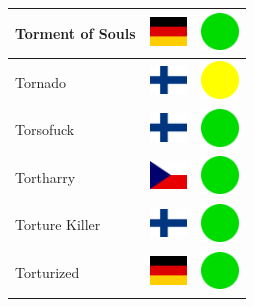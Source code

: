 \documentclass[12pt, a4paper, twoside]{report}
\begin{document}
\begin{center}
\begin{longtable}{|p{5cm}|p{2cm}|p{2cm}|}
 Torment of Souls                                           & \includegraphics[width=1cm]{../4x3/de} &   \includegraphics[width=1cm]{../likes/y} \\ \hline
 Tornado                                                    & \includegraphics[width=1cm]{../4x3/fi} &   \includegraphics[width=1cm]{../likes/m} \\ \hline
 Torsofuck                                                  & \includegraphics[width=1cm]{../4x3/fi} &   \includegraphics[width=1cm]{../likes/y} \\ \hline
 Tortharry                                                  & \includegraphics[width=1cm]{../4x3/cz} &   \includegraphics[width=1cm]{../likes/y} \\ \hline
 Torture Killer                                             & \includegraphics[width=1cm]{../4x3/fi} &   \includegraphics[width=1cm]{../likes/y} \\ \hline
 Torturized                                                 & \includegraphics[width=1cm]{../4x3/de} &   \includegraphics[width=1cm]{../likes/y} \\ \hline

\end{longtable}
\end{center}
\end{document}
